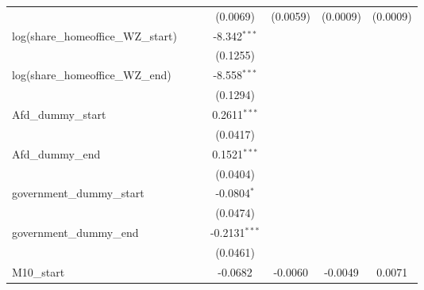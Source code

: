 \documentclass[10pt,a4paper]{article}
\begin{document}
\begin{tabular}{lcccccc}
                                                    &                &                & (0.0069)        & (0.0059)       & (0.0009)        & (0.0009)\\   
   log(share\_homeoffice\_WZ\_start)                &                &                & -8.342$^{***}$  &                &                 &   \\   
                                                    &                &                & (0.1255)        &                &                 &   \\   
   log(share\_homeoffice\_WZ\_end)                  &                &                & -8.558$^{***}$  &                &                 &   \\   
                                                    &                &                & (0.1294)        &                &                 &   \\   
   Afd\_dummy\_start                                &                &                & 0.2611$^{***}$  &                &                 &   \\   
                                                    &                &                & (0.0417)        &                &                 &   \\   
   Afd\_dummy\_end                                  &                &                & 0.1521$^{***}$  &                &                 &   \\   
                                                    &                &                & (0.0404)        &                &                 &   \\
   government\_dummy\_start                         &                &                & -0.0804$^{*}$   &                &                 &   \\   
                                                    &                &                & (0.0474)        &                &                 &   \\   
   government\_dummy\_end                           &                &                & -0.2131$^{***}$ &                &                 &   \\   
                                                    &                &                & (0.0461)        &                &                 &   \\
   \midrule      
   M10\_start                                       &                &                & -0.0682         & -0.0060        & -0.0049         & 0.0071\\   

\end{tabular}
\end{document}

